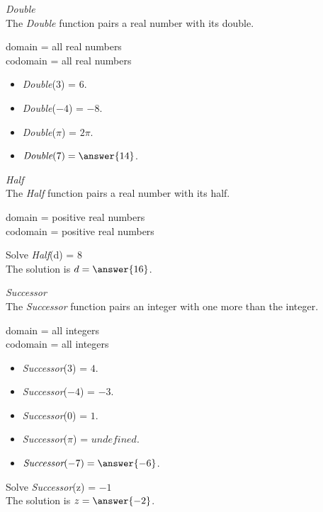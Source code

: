 \documentclass{ximera}
\begin{document}
\begin{example} \textit{Double} \\
The \textit{Double} function pairs a real number with its double.

domain = all real numbers  \\ 
codomain = all real numbers


\begin{itemize}
\item \textit{Double}($3$) = $6$.
\item \textit{Double}($-4$) = $-8$.
\item \textit{Double}($\pi$) = $2 \pi$.

\item $\textit{Double}(7) = \answer{14}$.
\end{itemize}

\end{example} 







\begin{example} \textit{Half} \\
The \textit{Half} function pairs a real number with its half.

domain = positive real numbers  \\ 
codomain = positive real numbers


Solve \textit{Half}(d) = $8$ \\

The solution is $d = \answer{16}$.

\end{example} 







\begin{example} \textit{Successor} \\
The \textit{Successor} function pairs an integer with one more than the integer.

domain = all integers  \\ 
codomain = all integers


\begin{itemize}
\item \textit{Successor}($3$) = $4$.
\item \textit{Successor}($-4$) = $-3$.
\item \textit{Successor}($0$) = $1$.
\item \textit{Successor}($\pi$) = $undefined$.

\item $\textit{Successor}(-7) = \answer{-6}$.
\end{itemize}


Solve \textit{Successor}(z) = $-1$ \\

The solution is $z = \answer{-2}$.

\end{example} 
\end{document}
